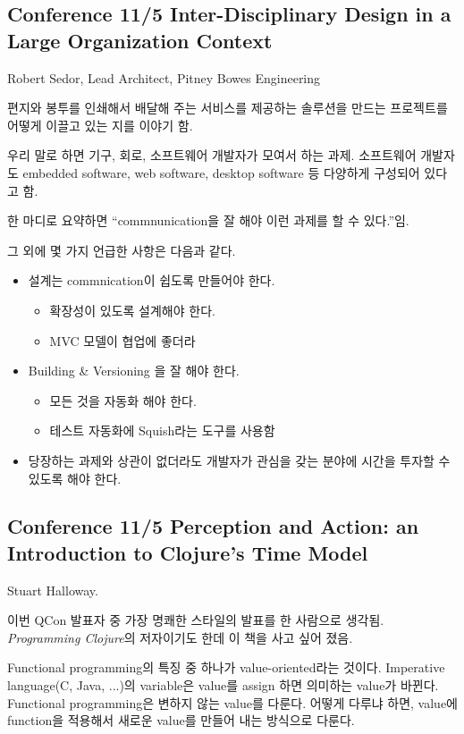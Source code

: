 \documentclass[a4paper]{article}
\begin{document}
\subsection{Conference 11/5 Inter-Disciplinary Design in a Large
  Organization Context}
 
Robert Sedor, Lead Architect, Pitney Bowes Engineering
 
편지와 봉투를 인쇄해서 배달해 주는 서비스를 제공하는 솔루션을 만드는
프로젝트를 어떻게 이끌고 있는 지를 이야기 함.
 
우리 말로 하면 기구, 회로, 소프트웨어 개발자가 모여서 하는
과제. 소프트웨어 개발자도 embedded software, web software, desktop
software 등 다양하게 구성되어 있다고 함.
 
한 마디로 요약하면 ``commnunication을 잘 해야 이런 과제를 할 수 있다.''임.
 
그 외에 몇 가지 언급한 사항은 다음과 같다.
\begin{itemize}
\item 설계는 commnication이 쉽도록 만들어야 한다.
    \begin{itemize}
    \item 확장성이 있도록 설계해야 한다.
    \item MVC 모델이 협업에 좋더라
    \end{itemize}
\item Building \& Versioning 을 잘 해야 한다.
    \begin{itemize}
    \item 모든 것을 자동화 해야 한다.
    \item 테스트 자동화에 Squish라는 도구를 사용함
    \end{itemize}
\item 당장하는 과제와 상관이 없더라도 개발자가 관심을 갖는 분야에 시간을 투자할 수 있도록 해야 한다.
\end{itemize}
 
\subsection{Conference 11/5 Perception and Action: an Introduction to
  Clojure's Time Model}
 
Stuart Halloway.
 
이번 QCon 발표자 중 가장 명쾌한 스타일의 발표를 한 사람으로
생각됨. \textit{Programming Clojure}의 저자이기도 한데 이 책을 사고 싶어
졌음.
 
Functional programming의 특징 중 하나가 value-oriented라는
것이다. Imperative language(C, Java, ...)의 variable은 value를 assign
하면 의미하는 value가 바뀐다. Functional programming은 변하지 않는
value를 다룬다. 어떻게 다루냐 하면, value에 function을 적용해서 새로운
value를 만들어 내는 방식으로 다룬다.
 
\end{document}
